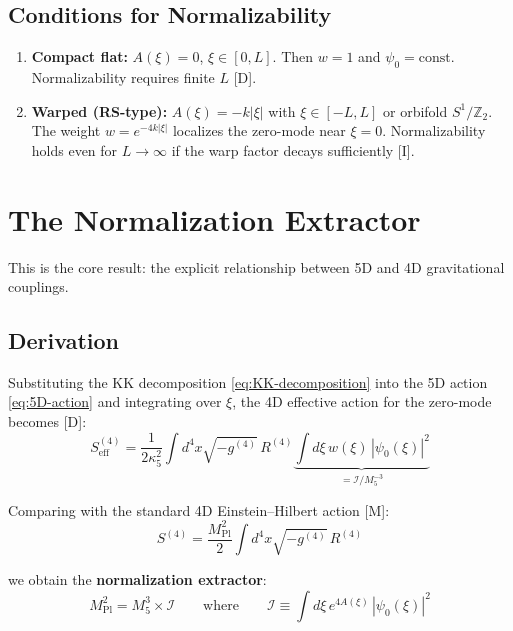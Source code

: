 \documentclass[11pt,a4paper]{article}
\newcommand{\Mpl}{M_{\text{Pl}}}
\newcommand{\Mfive}{M_5}
\newcommand{\kfive}{\kappa_5}
\newcommand{\calI}{\mathcal{I}}
\begin{document}
\subsection{Conditions for Normalizability}

\begin{enumerate}
    \item \textbf{Compact flat:} $A(\xi) = 0$, $\xi \in [0, L]$.
          Then $w = 1$ and $\psi_0 = \text{const}$.
          Normalizability requires finite $L$ [D].

    \item \textbf{Warped (RS-type):} $A(\xi) = -k|\xi|$ with $\xi \in [-L, L]$ or
          orbifold $S^1/\mathbb{Z}_2$. The weight $w = e^{-4k|\xi|}$ localizes
          the zero-mode near $\xi = 0$. Normalizability holds even for
          $L \to \infty$ if the warp factor decays sufficiently [I].
\end{enumerate}

\section{The Normalization Extractor}
\label{sec:extractor}

This is the core result: the explicit relationship between 5D and 4D
gravitational couplings.

\subsection{Derivation}

Substituting the KK decomposition \eqref{eq:KK-decomposition} into the
5D action \eqref{eq:5D-action} and integrating over $\xi$, the 4D effective
action for the zero-mode becomes [D]:
\begin{equation}
S_{\text{eff}}^{(4)} = \frac{1}{2\kfive^2}
\int d^4x \sqrt{-g^{(4)}} \, R^{(4)}
\underbrace{\int d\xi \, w(\xi) \, |\psi_0(\xi)|^2}_{= \calI / \Mfive^{-3}}
\end{equation}

Comparing with the standard 4D Einstein--Hilbert action [M]:
\begin{equation}
S^{(4)} = \frac{\Mpl^2}{2} \int d^4x \sqrt{-g^{(4)}} \, R^{(4)}
\end{equation}

we obtain the \textbf{normalization extractor}:
\begin{equation}
\label{eq:extractor-main}
\boxed{
\Mpl^2 = \Mfive^3 \times \calI
\qquad \text{where} \qquad
\calI \equiv \int d\xi \, e^{4A(\xi)} \, |\psi_0(\xi)|^2
}
\end{equation}
\end{document}
